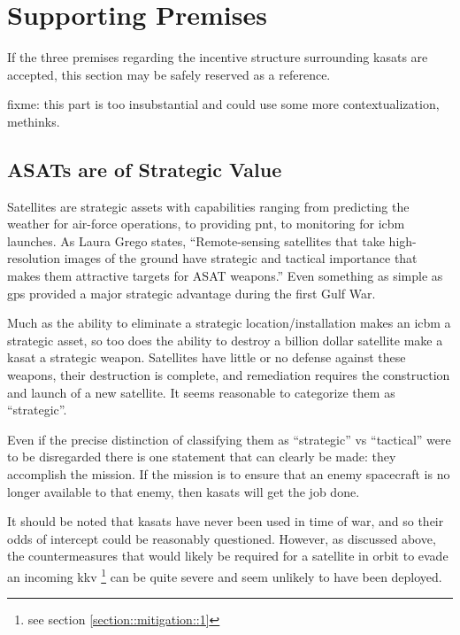 \section{Supporting Premises}
\label{section::support}

If the three premises regarding the incentive structure surrounding
\acp{kasat} are accepted, this section may be safely reserved as a
reference.

fixme: this part is too insubstantial and could use some more
contextualization, methinks.

\subsection{ASATs are of Strategic Value}

Satellites are strategic assets with capabilities ranging from
predicting the weather for air-force operations, to providing
\ac{pnt}, to monitoring for \ac{icbm} launches.  As Laura Grego
states, ``Remote-sensing satellites that take high-resolution images
of the ground have strategic and tactical importance that makes them
attractive targets for ASAT weapons.''\cite[p16]{grego} Even something
as simple as \ac{gps} provided a major strategic advantage during the
first Gulf War.\cite{gps-gulf}

Much as the ability to eliminate a strategic location/installation
makes an \ac{icbm} a strategic asset, so too does the ability to
destroy a billion dollar satellite make a \ac{kasat} a strategic
weapon.  Satellites have little or no defense against these weapons,
their destruction is complete, and remediation requires the
construction and launch of a new satellite.  It seems reasonable to
categorize them as ``strategic''.

Even if the precise distinction of classifying them as ``strategic''
vs ``tactical'' were to be disregarded there is one statement that can
clearly be made: they accomplish the mission.  If the mission is to
ensure that an enemy spacecraft is no longer available to that enemy,
then \acp{kasat} will get the job done.

It should be noted that \acp{kasat} have never been used in time of
war\cite{brian}, and so their odds of intercept could be reasonably
questioned.  However, as discussed above, the countermeasures that
would likely be required for a satellite in orbit to evade an incoming
\ac{kkv} \footnote{see section \ref{section::mitigation::1}} can be
quite severe and seem unlikely to have been deployed.

